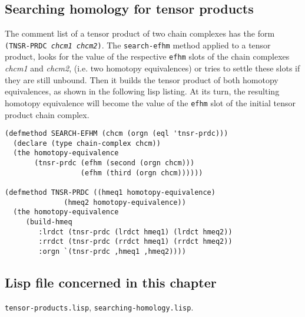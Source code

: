 \subsection {Searching homology for tensor products}

The comment list of a tensor product of two chain complexes has the form 
{\tt (TNSR-PRDC {\em chcm1} {\em chcm2})}.
The {\tt search-efhm} method applied to a tensor product, looks for the value of the 
respective {\tt efhm} slots of the chain complexes {\em chcm1} and {\em chcm2}, (i.e. two homotopy equivalences) or tries
to settle  these slots if they are still unbound.
Then it builds the tensor product of both homotopy equivalences, as shown in the following lisp listing. At its turn,
the resulting homotopy equivalence will become the value of the {\tt efhm} slot of the initial tensor product 
chain complex.
{\footnotesize\begin{verbatim}
(defmethod SEARCH-EFHM (chcm (orgn (eql 'tnsr-prdc)))
  (declare (type chain-complex chcm))
  (the homotopy-equivalence
       (tnsr-prdc (efhm (second (orgn chcm)))
                  (efhm (third (orgn chcm))))))

(defmethod TNSR-PRDC ((hmeq1 homotopy-equivalence)
		      (hmeq2 homotopy-equivalence))
  (the homotopy-equivalence
     (build-hmeq
        :lrdct (tnsr-prdc (lrdct hmeq1) (lrdct hmeq2))
        :rrdct (tnsr-prdc (rrdct hmeq1) (rrdct hmeq2))
        :orgn `(tnsr-prdc ,hmeq1 ,hmeq2))))
\end{verbatim}}

\subsection* {Lisp file concerned in this chapter}

{\tt tensor-products.lisp}, {\tt searching-homology.lisp}.







